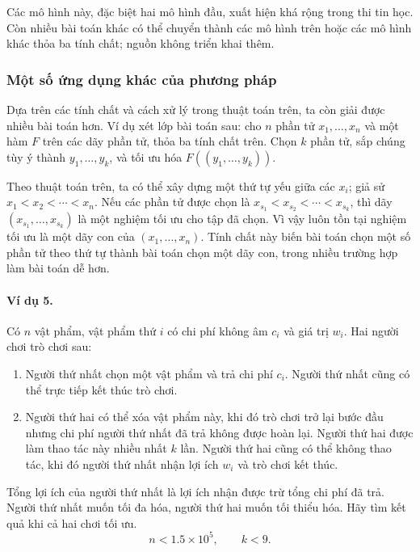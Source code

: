 \documentclass[11pt]{article}
\begin{document}
Các mô hình này, đặc biệt hai mô hình đầu, xuất hiện khá rộng trong thi tin học.
Còn nhiều bài toán khác có thể chuyển thành các mô hình trên hoặc các mô hình
khác thỏa ba tính chất; nguồn không triển khai thêm.

\subsubsection{Một số ứng dụng khác của phương pháp}

Dựa trên các tính chất và cách xử lý trong thuật toán trên, ta còn giải được
nhiều bài toán hơn. Ví dụ xét lớp bài toán sau: cho $n$ phần tử
$x_1,\ldots,x_n$ và một hàm $F$ trên các dãy phần tử, thỏa ba tính chất trên.
Chọn $k$ phần tử, sắp chúng tùy ý thành $y_1,\ldots,y_k$, và tối ưu hóa
$F((y_1,\ldots,y_k))$.

Theo thuật toán trên, ta có thể xây dựng một thứ tự yếu giữa các $x_i$; giả sử
$x_1<x_2<\cdots<x_n$. Nếu các phần tử được chọn là
$x_{s_1}<x_{s_2}<\cdots<x_{s_k}$, thì dãy
$(x_{s_1},\ldots,x_{s_k})$ là một nghiệm tối ưu cho tập đã chọn. Vì vậy luôn tồn
tại nghiệm tối ưu là một dãy con của $(x_1,\ldots,x_n)$. Tính chất này biến
bài toán chọn một số phần tử theo thứ tự thành bài toán chọn một dãy con, trong
nhiều trường hợp làm bài toán dễ hơn.

\paragraph{Ví dụ 5.}
Có $n$ vật phẩm, vật phẩm thứ $i$ có chi phí không âm $c_i$ và giá trị $w_i$.
Hai người chơi trò chơi sau:
\begin{enumerate}
  \item Người thứ nhất chọn một vật phẩm và trả chi phí $c_i$. Người thứ nhất
  cũng có thể trực tiếp kết thúc trò chơi.
  \item Người thứ hai có thể xóa vật phẩm này, khi đó trò chơi trở lại bước đầu
  nhưng chi phí người thứ nhất đã trả không được hoàn lại. Người thứ hai được
  làm thao tác này nhiều nhất $k$ lần. Người thứ hai cũng có thể không thao tác,
  khi đó người thứ nhất nhận lợi ích $w_i$ và trò chơi kết thúc.
\end{enumerate}
Tổng lợi ích của người thứ nhất là lợi ích nhận được trừ tổng chi phí đã trả.
Người thứ nhất muốn tối đa hóa, người thứ hai muốn tối thiểu hóa. Hãy tìm kết
quả khi cả hai chơi tối ưu.
\[
  n<1.5\times 10^5,\qquad k<9.
\]
\end{document}
